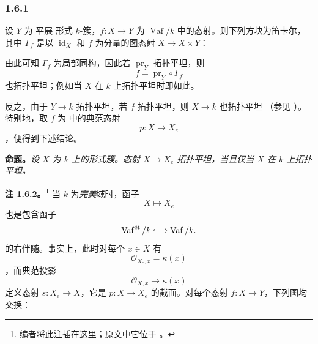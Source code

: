 
\subsubsection*{1.6.1}
\label{sga3:VIIB:1.6.1}

设 \(Y\) 为 平展 形式 \(k\)-簇，\(f:X\to Y\) 为 \(\operatorname{Vaf}/k\) 中的态射。则下列方块为笛卡尔，其中 \(\Gamma_f\) 是以 \(\operatorname{id}_X\) 和 \(f\) 为分量的图态射 \(X\to X\times Y\)：

\begin{center}
  \label{sga3:VIIB:1.6.1:cartesian-square}
  
\end{center}

由此可知 \(\Gamma_f\) 为局部同构，因此若 \(\operatorname{pr}_Y\) 拓扑平坦，则 \[
  f=\operatorname{pr}_Y\circ\Gamma_f
\] 也拓扑平坦；例如当 \(X\) 在 \(k\) 上拓扑平坦时即如此。

反之，由于 \(Y\to k\) 拓扑平坦，若 \(f\) 拓扑平坦，则 \(X\to k\) 也拓扑平坦 \textup{（参见 ）}。特别地，取 \(f\) 为  中的典范态射 \[
  p:X\longrightarrow X_e
\]，便得到下述结论。

\medskip\noindent\textbf{命题。} \label{sga3:VIIB:1.6.1.prop}{\itshape 设 \(X\) 为 \(k\) 上的形式簇。态射 \(X\to X_e\) 拓扑平坦，当且仅当 \(X\) 在 \(k\) 上拓扑平坦。}

\medskip\noindent\textbf{注 1.6.2。}\footnote{\label{sga3:VIIB:nde:74}编者将此注插在这里；原文中它位于 。} \label{sga3:VIIB:1.6.2} 当 \(k\) 为\emph{完美}域时，函子 \[
  X\longmapsto X_e
\] 也是包含函子 \[
  \operatorname{Vaf}^{\mathrm{\acute{e}t}}/k
  \lhook\joinrel\longrightarrow
  \operatorname{Vaf}/k.
\] 的右伴随。事实上，此时对每个 \(x\in X\) 有 \[
  \mathcal O_{X_e,x}=\kappa(x)
\]，而典范投影 \[
  \mathcal O_{X,x}\longrightarrow\kappa(x)
\] 定义态射 \(s:X_e\to X\)，它是 \(p:X\to X_e\) 的截面。对每个态射 \(f:X\to Y\)，下列图均交换：

